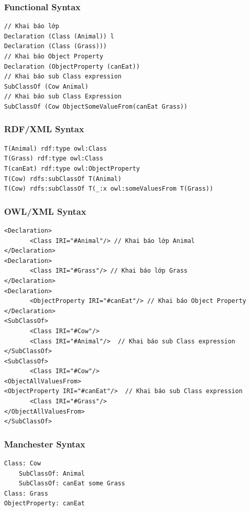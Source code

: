 \subsubsection{Functional Syntax}
\begin{verbatim}
// Khai báo lớp
Declaration (Class (Animal)) l
Declaration (Class (Grass))) 
// Khai báo Object Property
Declaration (ObjectProperty (canEat))  
// Khai báo sub Class expression
SubClassOf (Cow Animal)  
// Khai báo sub Class Expression
SubClassOf (Cow ObjectSomeValueFrom(canEat Grass))  
\end{verbatim}

\subsubsection{RDF/XML Syntax}
\begin{verbatim}
T(Animal) rdf:type owl:Class
T(Grass) rdf:type owl:Class
T(canEat) rdf:type owl:ObjectProperty
T(Cow) rdfs:subClassOf T(Animal) 
T(Cow) rdfs:subClassOf T(_:x owl:someValuesFrom T(Grass))
\end{verbatim}


\subsubsection{OWL/XML Syntax}
\begin{verbatim}
<Declaration>
       <Class IRI="#Animal"/> // Khai báo lớp Animal
</Declaration>
<Declaration>
       <Class IRI="#Grass"/> // Khai báo lớp Grass
</Declaration>
<Declaration>
       <ObjectProperty IRI="#canEat"/> // Khai báo Object Property 
</Declaration>
<SubClassOf>
       <Class IRI="#Cow"/>
       <Class IRI="#Animal"/>  // Khai báo sub Class expression
</SubClassOf>
<SubClassOf>
       <Class IRI="#Cow"/>
<ObjectAllValuesFrom>
<ObjectProperty IRI="#canEat"/>  // Khai báo sub Class expression
       <Class IRI="#Grass"/>
</ObjectAllValuesFrom>
</SubClassOf>
\end{verbatim}


\subsubsection{Manchester Syntax}

\begin{verbatim}
Class: Cow 
    SubClassOf: Animal 
    SubClassOf: canEat some Grass
Class: Grass
ObjectProperty: canEat
\end{verbatim}


